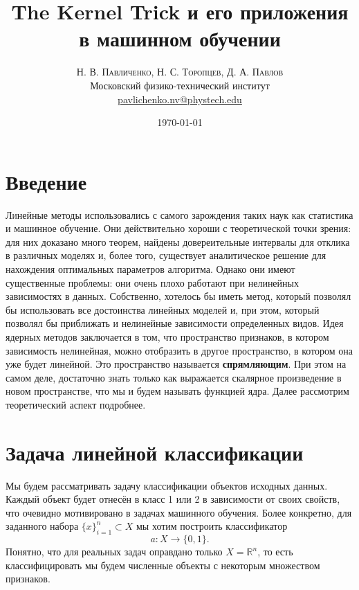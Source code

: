 \documentclass[twoside,twocolumn]{article}
\title{The Kernel Trick и его приложения в машинном обучении} %
\author{%
\textsc{Н. В. Павличенко, Н. С. Торопцев, Д. А. Павлов} \\[1ex] %
\normalsize Московский физико-технический институт \\ %
\normalsize \href{mailto:pavlichenko.nv@phystech.edu}{pavlichenko.nv@phystech.edu} %
}
\date{\today} %
\theoremstyle{plain}
\theoremstyle{definition}
\begin{document}
\maketitle


\section{Введение}

\lettrine[nindent=0em,lines=3]{Л} инейные методы использовались с самого зарождения таких наук как статистика и машинное обучение.
 Они действительно хороши с теоретической точки зрения: для них доказано много теорем, найдены
довереительные интервалы для отклика в различных моделях и, более того, существует аналитическое решение для нахождения
оптимальных параметров алгоритма. Однако они имеют существенные проблемы: они очень плохо работают при нелинейных
зависимостях в данных. Собственно, хотелось бы иметь метод, который позволял бы использовать все достоинства линейных моделей
и, при этом, который позволял бы приближать и нелинейные зависимости определенных видов. Идея ядерных методов заключается в
том, что пространство признаков, в котором зависимость нелинейная, можно отобразить в другое пространство, в котором она уже
будет линейной. Это пространство называется \textbf{спрямляющим}. При этом на самом деле, достаточно знать только как выражается скалярное
произведение в новом пространстве, что мы и будем называть функцией ядра. Далее рассмотрим теоретический аспект подробнее.

\section{Задача линейной классификации}
Мы будем рассматривать задачу классификации объектов исходных данных. Каждый объект будет отнесён в класс 1 или 2 в зависимости от своих свойств, что очевидно мотивировано в задачах машинного обучения. Более конкретно, для заданного набора $\{x\}_{i = 1}^n \subset X$ мы хотим построить классификатор 
\[a: X \xrightarrow{} \{0, 1\}.\]
Понятно, что для реальных задач оправдано только $X = \mathbb{R}^n$, то есть классифицировать мы будем численные объекты с некоторым множеством признаков.
\end{document}
